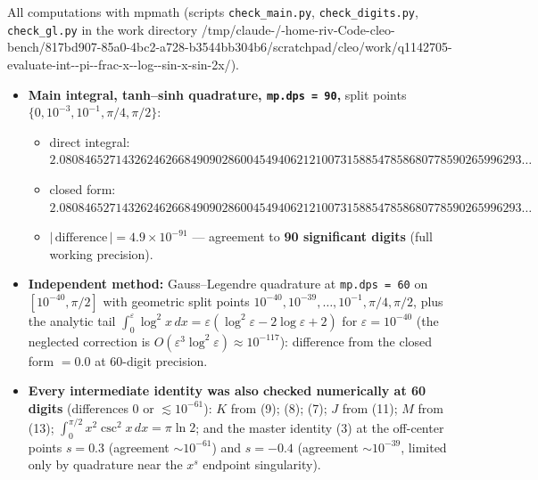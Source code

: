 \documentclass[11pt]{article}
\theoremstyle{remark}
\begin{document}
All computations with mpmath (scripts \texttt{check\_main.py}, \texttt{check\_digits.py}, \texttt{check\_gl.py} in the work directory
{\footnotesize\ttfamily /tmp/\allowbreak claude-/\allowbreak -home-\allowbreak riv-\allowbreak Code-\allowbreak cleo-\allowbreak bench/\allowbreak 817bd907-\allowbreak 85a0-\allowbreak 4bc2-\allowbreak a728-\allowbreak b3544bb304b6/\allowbreak scratchpad/\allowbreak cleo/\allowbreak work/\allowbreak q1142705-\allowbreak evaluate-\allowbreak int--\allowbreak pi--\allowbreak frac-\allowbreak x--\allowbreak log--\allowbreak sin-\allowbreak x-\allowbreak sin-\allowbreak 2x/}).

\begin{itemize}
\item \textbf{Main integral, tanh--sinh quadrature, \texttt{mp.dps = 90},} split points $\{0,10^{-3},10^{-1},\pi/4,\pi/2\}$:
  \begin{itemize}
  \item direct integral:\\ {\footnotesize$2.08084652714326246266849090286004549406212100731588547858680778590265996293\ldots$}
  \item closed form:\\ {\footnotesize$2.08084652714326246266849090286004549406212100731588547858680778590265996293\ldots$}
  \item $|\,\text{difference}\,| = 4.9\times10^{-91}$ --- agreement to \textbf{90 significant digits} (full working precision).
  \end{itemize}
\item \textbf{Independent method:} Gauss--Legendre quadrature at \texttt{mp.dps = 60} on $[10^{-40},\pi/2]$ with geometric split points $10^{-40},10^{-39},\dots,10^{-1},\pi/4,\pi/2$, plus the analytic tail $\int_0^{\varepsilon}\log^{2}x\,dx=\varepsilon(\log^{2}\varepsilon-2\log\varepsilon+2)$ for $\varepsilon=10^{-40}$ (the neglected correction is $O(\varepsilon^{3}\log^{2}\varepsilon)\approx10^{-117}$): difference from the closed form $=0.0$ at 60-digit precision.
\item \textbf{Every intermediate identity was also checked numerically at 60 digits} (differences $0$ or $\lesssim10^{-61}$):
  $K$ from (9); (8); (7); $J$ from (11); $M$ from (13); $\int_0^{\pi/2}x^{2}\csc^{2}x\,dx=\pi\ln2$; and the master identity (3) at the off-center points $s=0.3$ (agreement $\sim10^{-61}$) and $s=-0.4$ (agreement $\sim10^{-39}$, limited only by quadrature near the $x^{s}$ endpoint singularity).
\end{itemize}
\end{document}
